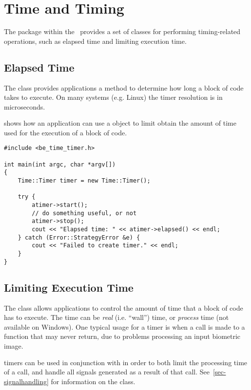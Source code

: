 %
%
\chapter{Time and Timing}
\label{chp-time}

The  package within the \lname\ provides a set of classes for performing
timing-related operations, such as elapsed time and limiting execution time.

\section{Elapsed Time}

The  class provides applications a method to determine how long
a block of code takes to execute. On many systems (e.g. Linux) the timer
resolution is in microseconds.

 shows how an application can use a 
object to limit obtain the amount of time used for the execution of a block
of code.

\begin{lstlisting}[caption={Using the \class{Timer}}, label=lst:timeruse]
#include <be_time_timer.h>

int main(int argc, char *argv[])
{
	Time::Timer timer = new Time::Timer();

	try {
		atimer->start();
		// do something useful, or not
		atimer->stop();
		cout << "Elapsed time: " << atimer->elapsed() << endl;
	} catch (Error::StrategyError &e) {
		cout << "Failed to create timer." << endl;
	}
}
\end{lstlisting}

\section{Limiting Execution Time}

The  class allows applications to control the amount of time
that a block of code has to execute. The time can be {\em real} (i.e. ``wall'')
time, or {\em process} time (not available on Windows). One typical usage for
a  timer is when a call is made to a function that may never return,
due to problems processing an input biometric image.

 timers can be used in conjunction with  in
order to both limit the processing time of a call, and handle all signals
generated as a result of that call. See~\ref{sec-signalhandling} for
information on the  class.


